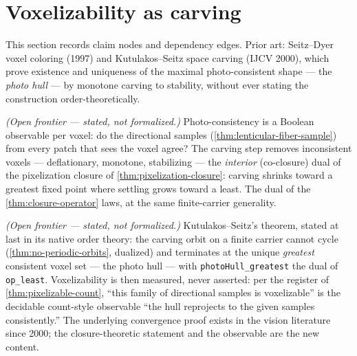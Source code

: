 \section{Voxelizability as carving}

This section records claim nodes and dependency edges. Prior art: Seitz--Dyer voxel
coloring (1997) and Kutulakos--Seitz space carving (IJCV 2000), which prove existence and
uniqueness of the maximal photo-consistent shape --- the \emph{photo hull} --- by
monotone carving to stability, without ever stating the construction order-theoretically.

\begin{proposition}\label{thm:carving-interior}\notready{}
\emph{(Open frontier --- stated, not formalized.)} Photo-consistency is a Boolean
observable per voxel: do the directional samples (\cref{thm:lenticular-fiber-sample})
from every patch that sees the voxel agree? The carving step removes inconsistent voxels
--- deflationary, monotone, stabilizing --- the \emph{interior} (co-closure) dual of the
pixelization closure of \cref{thm:pixelization-closure}: carving shrinks toward a
greatest fixed point where settling grows toward a least. The dual of the
\cref{thm:closure-operator} laws, at the same finite-carrier generality.
\end{proposition}

\begin{theorem}\label{thm:photo-hull}\notready{}
\emph{(Open frontier --- stated, not formalized.)} Kutulakos--Seitz's theorem, stated at
last in its native order theory: the carving orbit on a finite carrier cannot cycle
(\cref{thm:no-periodic-orbits}, dualized) and terminates at the unique \emph{greatest}
consistent voxel set --- the photo hull --- with \texttt{photoHull\_greatest} the dual of
\texttt{op\_least}. Voxelizability is then measured, never asserted: per the register of
\cref{thm:pixelizable-count}, ``this family of directional samples is voxelizable'' is
the decidable count-style observable ``the hull reprojects to the given samples
consistently.'' The underlying convergence proof exists in the vision literature since
2000; the closure-theoretic statement and the observable are the new content.
\end{theorem}
